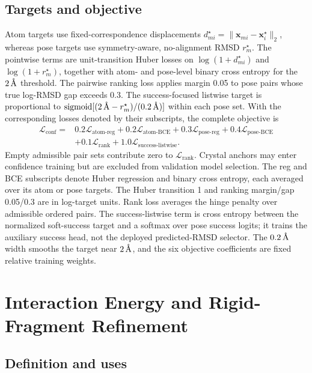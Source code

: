 \documentclass{article}
\newcommand{\angstrom}{\text{\normalfont\AA}}
\begin{document}
\subsection{Targets and objective}
\label{app:confidence_loss_details}

Atom targets use fixed-correspondence displacements \(d_{mi}^\star=\|\mathbf x_{mi}-\mathbf x_i^\star\|_2\), whereas pose targets use symmetry-aware, no-alignment RMSD \(r_m^\star\).
The pointwise terms are unit-transition Huber losses on \(\log(1+d_{mi}^\star)\) and \(\log(1+r_m^\star)\), together with atom- and pose-level binary cross entropy for the \(2\,\angstrom\) threshold.
The pairwise ranking loss applies margin 0.05 to pose pairs whose true log-RMSD gap exceeds 0.3.
The success-focused listwise target is proportional to
\(\operatorname{sigmoid}[(2\,\angstrom-r_m^\star)/(0.2\,\angstrom)]\) within each pose set.
With the corresponding losses denoted by their subscripts, the complete objective is
\begin{align}
\mathcal L_{\mathrm{conf}}
={}&0.2\mathcal L_{\mathrm{atom\text{-}reg}}
+0.2\mathcal L_{\mathrm{atom\text{-}BCE}}
+0.3\mathcal L_{\mathrm{pose\text{-}reg}}
+0.4\mathcal L_{\mathrm{pose\text{-}BCE}}
\nonumber\\
&+0.1\mathcal L_{\mathrm{rank}}
+1.0\mathcal L_{\mathrm{success\text{-}listwise}}.
\label{eq:si_confidence_loss}
\end{align}
Empty admissible pair sets contribute zero to \(\mathcal L_{\mathrm{rank}}\).
Crystal anchors may enter confidence training but are excluded from validation model selection.
The reg and BCE subscripts denote Huber regression and binary cross entropy, each averaged over its atom or pose targets. The Huber transition 1 and ranking margin/gap 0.05/0.3 are in log-target units. Rank loss averages the hinge penalty over admissible ordered pairs. The success-listwise term is cross entropy between the normalized soft-success target and a softmax over pose success logits; it trains the auxiliary success head, not the deployed predicted-RMSD selector. The \(0.2\,\angstrom\) width smooths the target near \(2\,\angstrom\), and the six objective coefficients are fixed relative training weights.

\section{Interaction Energy and Rigid-Fragment Refinement}
\label{si:guidance}

\subsection{Definition and uses}
\label{si:guidance_scope}
\end{document}
